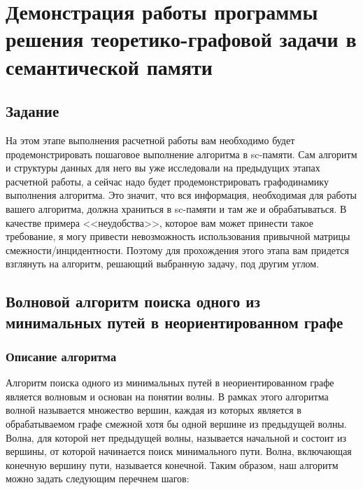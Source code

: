 
\chapter{Демонстрация работы программы решения теоретико-графовой
  задачи в семантической памяти}

\section{Задание}

На этом этапе выполнения расчетной работы вам необходимо будет
продемонстрировать пошаговое выполнение алгоритма в sc-памяти. Сам
алгоритм и структуры данных для него вы уже исследовали на предыдущих
этапах расчетной работы, а сейчас надо будет продемонстрировать
графодинамику выполнения алгоритма. Это значит, что вся информация,
необходимая для работы вашего алгоритма, должна храниться в sc-памяти
и там же и обрабатываться. В качестве примера <<неудобства>>, которое
вам может принести такое требование, я могу привести невозможность
использования привычной матрицы смежности/инцидентности.  Поэтому для
прохождения этого этапа вам придется взглянуть на алгоритм, решающий
выбранную задачу, под другим углом.

\section{Волновой алгоритм поиска одного из минимальных путей в
  неориентированном графе}

\subsection{Описание алгоритма}
\label{sec:-Algo_desc}

Алгоритм поиска одного из минимальных путей в неориентированном графе
является волновым и основан на понятии волны. В рамках этого алгоритма
волной называется множество вершин, каждая из которых является в
обрабатываемом графе смежной хотя бы одной вершине из предыдущей
волны. Волна, для которой нет предыдущей волны, называется начальной и
состоит из вершины, от которой начинается поиск минимального
пути. Волна, включающая конечную вершину пути, называется
конечной. Таким образом, наш алгоритм можно задать следующим перечнем
шагов:

